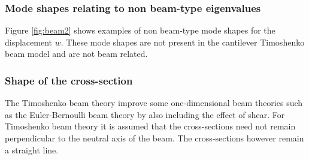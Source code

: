 	\subsubsection*{Mode shapes relating to non beam-type eigenvalues}
	Figure \ref{fig:beam2} shows examples of non beam-type mode shapes for the displacement $w$. These mode shapes are not present in the cantilever Timoshenko beam model and are not beam related. 
	\begin{figure}[h!]
	\end{figure}
	\FloatBarrier

	\subsubsection*{Shape of the cross-section}
	The Timoshenko beam theory improve some one-dimensional beam theories such as the Euler-Bernoulli beam theory by also including the effect of shear. For Timoshenko beam theory it is assumed that the cross-sections need not remain perpendicular to the neutral axis of the beam. The cross-sections however remain a straight line.

